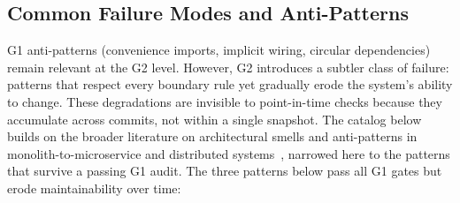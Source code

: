 \subsection*{Common Failure Modes and Anti-Patterns}

G1 anti-patterns (convenience imports, implicit wiring, circular dependencies) remain relevant at the G2 level. However, G2 introduces a subtler class of failure: patterns that respect every boundary rule yet gradually erode the system's ability to change. These degradations are invisible to point-in-time checks because they accumulate across commits, not within a single snapshot. The catalog below builds on the broader literature on architectural smells and anti-patterns in monolith-to-microservice and distributed systems~\cite{cerny2023tertiary, taibi2018smells}, narrowed here to the patterns that survive a passing G1 audit. The three patterns below pass all G1 gates but erode maintainability over time:

